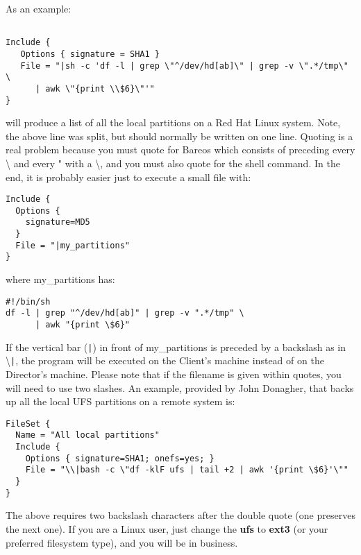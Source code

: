 \begin{itemize}
   As an  example:

\footnotesize
\begin{verbatim}

Include {
   Options { signature = SHA1 }
   File = "|sh -c 'df -l | grep \"^/dev/hd[ab]\" | grep -v \".*/tmp\" \
      | awk \"{print \\$6}\"'"
}
\end{verbatim}
\normalsize

   will produce a list of all the local partitions on a Red Hat Linux system.
   Note, the above line was split, but should normally  be written on one line.
   Quoting is a real problem because you must quote for Bareos  which consists of
   preceding every \textbackslash{} and every " with a \textbackslash{}, and
   you must also quote for the shell command. In the end, it is probably  easier
   just to execute a small file with:


\footnotesize
\begin{verbatim}
Include {
  Options {
    signature=MD5
  }
  File = "|my_partitions"
}
\end{verbatim}
\normalsize

   where my\_partitions has:

\footnotesize
\begin{verbatim}
#!/bin/sh
df -l | grep "^/dev/hd[ab]" | grep -v ".*/tmp" \
      | awk "{print \$6}"
\end{verbatim}
\normalsize

   If the vertical bar (\verb+|+) in front of my\_partitions is preceded by a
   backslash as in \textbackslash{}\verb+|+, the program will be executed on the
   Client's machine instead of on the Director's machine.
   Please note that if the filename is given within quotes, you
   will need to use two slashes.  An example, provided by John Donagher,
   that backs up all the local UFS partitions on a remote system is:

\footnotesize
\begin{verbatim}
FileSet {
  Name = "All local partitions"
  Include {
    Options { signature=SHA1; onefs=yes; }
    File = "\\|bash -c \"df -klF ufs | tail +2 | awk '{print \$6}'\""
  }
}
\end{verbatim}
\normalsize

   The above requires two backslash characters after the double quote (one
   preserves  the next one). If you are a Linux user, just change the {\bf ufs}
   to  {\bf ext3} (or your preferred filesystem type), and you will be in
   business.


\end{itemize}
